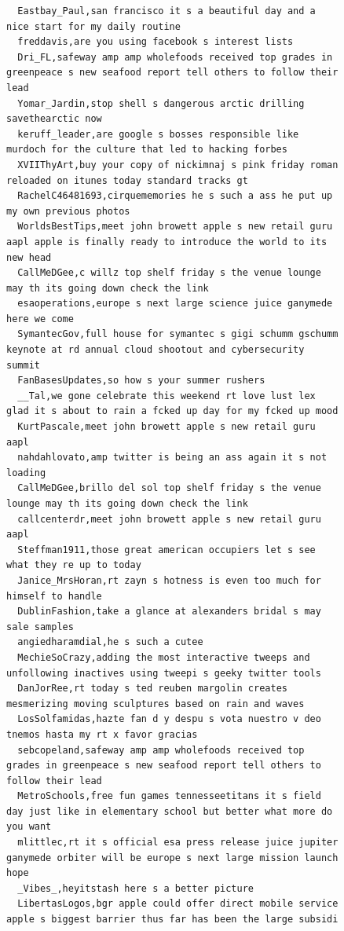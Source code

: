 \begin{figure}[htpb]
\begin{verbatim}
  Eastbay_Paul,san francisco it s a beautiful day and a nice start for my daily routine
  freddavis,are you using facebook s interest lists
  Dri_FL,safeway amp amp wholefoods received top grades in greenpeace s new seafood report tell others to follow their lead
  Yomar_Jardin,stop shell s dangerous arctic drilling savethearctic now
  keruff_leader,are google s bosses responsible like murdoch for the culture that led to hacking forbes
  XVIIThyArt,buy your copy of nickimnaj s pink friday roman reloaded on itunes today standard tracks gt
  RachelC46481693,cirquememories he s such a ass he put up my own previous photos
  WorldsBestTips,meet john browett apple s new retail guru aapl apple is finally ready to introduce the world to its new head
  CallMeDGee,c willz top shelf friday s the venue lounge may th its going down check the link
  esaoperations,europe s next large science juice ganymede here we come
  SymantecGov,full house for symantec s gigi schumm gschumm keynote at rd annual cloud shootout and cybersecurity summit
  FanBasesUpdates,so how s your summer rushers
  __Tal,we gone celebrate this weekend rt love lust lex glad it s about to rain a fcked up day for my fcked up mood
  KurtPascale,meet john browett apple s new retail guru aapl
  nahdahlovato,amp twitter is being an ass again it s not loading
  CallMeDGee,brillo del sol top shelf friday s the venue lounge may th its going down check the link
  callcenterdr,meet john browett apple s new retail guru aapl
  Steffman1911,those great american occupiers let s see what they re up to today
  Janice_MrsHoran,rt zayn s hotness is even too much for himself to handle
  DublinFashion,take a glance at alexanders bridal s may sale samples
  angiedharamdial,he s such a cutee
  MechieSoCrazy,adding the most interactive tweeps and unfollowing inactives using tweepi s geeky twitter tools
  DanJorRee,rt today s ted reuben margolin creates mesmerizing moving sculptures based on rain and waves
  LosSolfamidas,hazte fan d y despu s vota nuestro v deo tnemos hasta my rt x favor gracias
  sebcopeland,safeway amp amp wholefoods received top grades in greenpeace s new seafood report tell others to follow their lead
  MetroSchools,free fun games tennesseetitans it s field day just like in elementary school but better what more do you want
  mlittlec,rt it s official esa press release juice jupiter ganymede orbiter will be europe s next large mission launch hope
  _Vibes_,heyitstash here s a better picture
  LibertasLogos,bgr apple could offer direct mobile service apple s biggest barrier thus far has been the large subsidi

\end{verbatim}
\end{figure}
